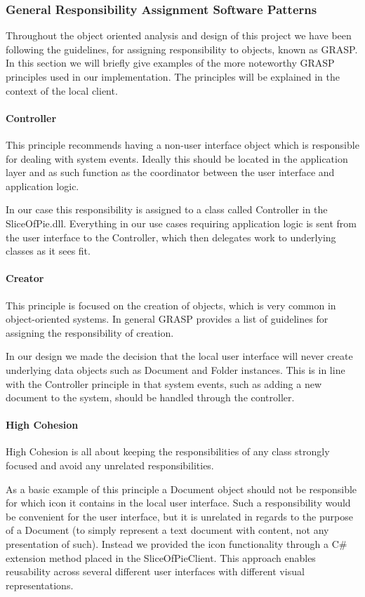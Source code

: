 \subsubsection{General Responsibility Assignment Software Patterns}
\label{sec:GRASP}

Throughout the object oriented analysis and design of this project we have been following the guidelines, for assigning responsibility to objects,  known as GRASP.
In this section we will briefly give examples of the more noteworthy GRASP principles used in our implementation. The principles will be explained in the context of the local client.

\paragraph{Controller}
This principle recommends having a non-user interface object which is responsible for dealing with system events. Ideally this should  be located in the application layer and as such function as the coordinator between the user interface and application logic.

In our case this responsibility is assigned to a class called Controller in the SliceOfPie.dll. Everything in our use cases requiring application logic is sent from the user interface to the Controller, which then delegates work to underlying classes as it sees fit.

\paragraph{Creator}
This principle is focused on the creation of objects, which is very common in object-oriented systems. In general GRASP provides a list of guidelines for assigning the responsibility of creation.

In our design we made the decision that the local user interface will never create underlying data objects such as Document and Folder instances. This is in line with the Controller principle in that system events, such as adding a new document to the system, should be handled through the controller.

\paragraph{High Cohesion}
High Cohesion is all about keeping the responsibilities of any class strongly focused and avoid any unrelated responsibilities. 

As a basic example of this principle a Document object should not be responsible for which icon it contains in the local user interface. Such a responsibility would be convenient for the user interface, but it is unrelated in regards to the purpose of a Document (to simply represent a text document with content, not any presentation of such). Instead we provided the icon functionality through a C\# extension method placed in the SliceOfPieClient. This approach enables reusability across several different user interfaces with different visual representations.

